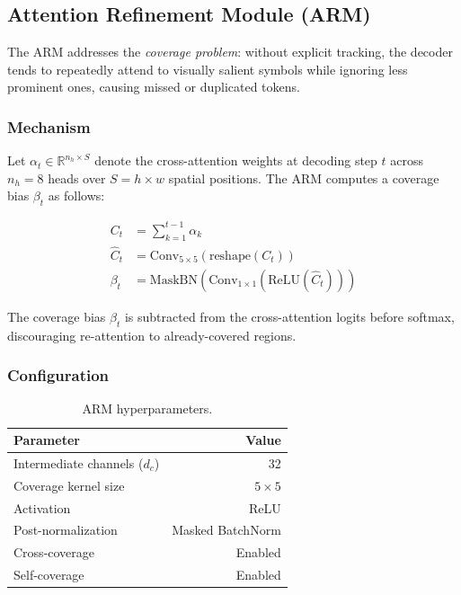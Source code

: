 \documentclass[11pt,a4paper]{article}
\begin{document}
\subsection{Attention Refinement Module (ARM)}
\label{sec:arm}

The ARM addresses the \emph{coverage problem}: without explicit tracking, the decoder tends to repeatedly attend to visually salient symbols while ignoring less prominent ones, causing missed or duplicated tokens.

\subsubsection{Mechanism}

Let $\alpha_t \in \mathbb{R}^{n_h \times S}$ denote the cross-attention weights at decoding step $t$ across $n_h = 8$ heads over $S = h \times w$ spatial positions. The ARM computes a coverage bias $\beta_t$ as follows:

\begin{align}
C_t &= \sum_{k=1}^{t-1} \alpha_k \label{eq:coverage} \\
\hat{C}_t &= \text{Conv}_{5 \times 5}\!\left(\text{reshape}(C_t)\right) \label{eq:conv} \\
\beta_t &= \text{MaskBN}\!\left(\text{Conv}_{1 \times 1}\!\left(\text{ReLU}(\hat{C}_t)\right)\right) \label{eq:bias}
\end{align}

The coverage bias $\beta_t$ is subtracted from the cross-attention logits before softmax, discouraging re-attention to already-covered regions.

\subsubsection{Configuration}

\begin{table}[H]
\centering
\caption{ARM hyperparameters.}
\label{tab:arm}
\begin{tabular}{lr}
\toprule
\textbf{Parameter} & \textbf{Value} \\
\midrule
Intermediate channels ($d_c$)  & 32 \\
Coverage kernel size           & $5 \times 5$ \\
Activation                     & ReLU \\
Post-normalization             & Masked BatchNorm \\
Cross-coverage                 & Enabled \\
Self-coverage                  & Enabled \\
\bottomrule
\end{tabular}
\end{table}
\end{document}
